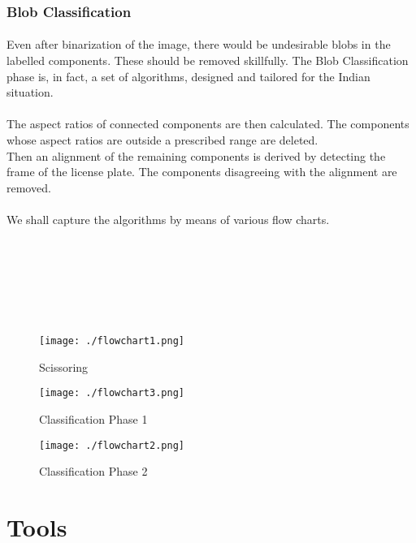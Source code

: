 \documentclass[a4paper,10pt]{iesreport}
\begin{document}
\subsubsection*{Blob Classification}
\paragraph*{}
Even after binarization of the image, there would be undesirable blobs in the labelled components. These should be removed skillfully.
The Blob Classification phase is, in fact, a set of algorithms, designed and tailored for the Indian situation. 
\paragraph*{}
The aspect ratios of connected components are then calculated.
The components whose aspect ratios are outside a prescribed
range are deleted. \\
Then an alignment of the remaining components is derived by detecting the frame of the license plate. The components disagreeing with the
alignment are removed.\\ \\
\newpage
We shall capture the algorithms by means of various flow charts.\\ \\ \\ \\ \\ \\ \\ 
\begin{figure}[h]
 \centering
 \texttt{[image: ./flowchart1.png]}
 \caption{Scissoring}
 \label{fig:flow1}
\end{figure}
\newpage
\begin{figure}[h]
 \centering
 \texttt{[image: ./flowchart3.png]}
 \caption{Classification Phase 1}
 \label{fig:flow2}
\end{figure}
\newpage
\begin{figure}[h]
 \centering
 \texttt{[image: ./flowchart2.png]}
 \caption{Classification Phase 2}
 \label{fig:flow3}
\end{figure}
\newpage
\section{Tools}
\end{document}
